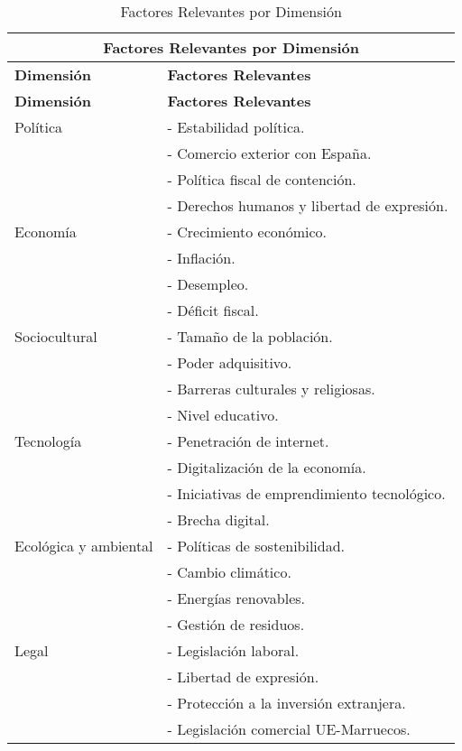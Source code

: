 \documentclass{article}  %
\begin{document}
\begin{longtable}{|l|l|}
\caption{Factores Relevantes por Dimensión} \label{tab:factores_relevantes} \\

\hline
\multicolumn{2}{|c|}{\textbf{Factores Relevantes por Dimensión}} \\
\hline
\textbf{Dimensión} & \textbf{Factores Relevantes} \\
\hline
\endfirsthead

\hline
\textbf{Dimensión} & \textbf{Factores Relevantes} \\
\hline
\endhead

\hline
\endfoot

\hline
Política & - Estabilidad política. \\
         & - Comercio exterior con España. \\
         & - Política fiscal de contención. \\
         & - Derechos humanos y libertad de expresión. \\
\hline
Economía & - Crecimiento económico. \\
         & - Inflación. \\
         & - Desempleo. \\
         & - Déficit fiscal. \\
\hline
Sociocultural & - Tamaño de la población. \\
              & - Poder adquisitivo. \\
              & - Barreras culturales y religiosas. \\
              & - Nivel educativo. \\
\hline
Tecnología & - Penetración de internet. \\
           & - Digitalización de la economía. \\
           & - Iniciativas de emprendimiento tecnológico. \\
           & - Brecha digital. \\
\hline
Ecológica y ambiental & - Políticas de sostenibilidad. \\
                       & - Cambio climático. \\
                       & - Energías renovables. \\
                       & - Gestión de residuos. \\
\hline
Legal & - Legislación laboral. \\
      & - Libertad de expresión. \\
      & - Protección a la inversión extranjera. \\
      & - Legislación comercial UE-Marruecos. \\
\hline
\end{longtable}
\end{document}
